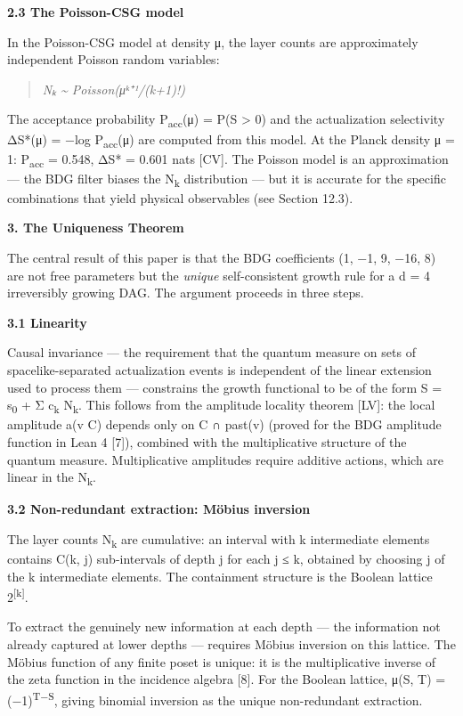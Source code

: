 \documentclass[12pt,a4paper]{article}
\begin{document}
\textbf{2.3 The Poisson-CSG model}

In the Poisson-CSG model at density μ, the layer counts are
approximately independent Poisson random variables:

\begin{quote}
\emph{Nₖ \textasciitilde{} Poisson(μᵏ⁺¹/(k+1)!)}
\end{quote}

The acceptance probability P\textsubscript{acc}(μ) = P(S \textgreater{}
0) and the actualization selectivity ΔS*(μ) = −log
P\textsubscript{acc}(μ) are computed from this model. At the Planck
density μ = 1: P\textsubscript{acc} = 0.548, ΔS* = 0.601 nats {[}CV{]}.
The Poisson model is an approximation --- the BDG filter biases the
N\textsubscript{k} distribution --- but it is accurate for the specific
combinations that yield physical observables (see Section 12.3).

\textbf{3. The Uniqueness Theorem}

The central result of this paper is that the BDG coefficients (1, −1, 9,
−16, 8) are not free parameters but the \emph{unique} self-consistent
growth rule for a d = 4 irreversibly growing DAG. The argument proceeds
in three steps.

\textbf{3.1 Linearity}

Causal invariance --- the requirement that the quantum measure on sets
of spacelike-separated actualization events is independent of the linear
extension used to process them --- constrains the growth functional to
be of the form S = s\textsubscript{0} + Σ c\textsubscript{k}
N\textsubscript{k}. This follows from the amplitude locality theorem
{[}LV{]}: the local amplitude a(v \textbar{} C) depends only on C ∩
past(v) (proved for the BDG amplitude function in Lean 4 {[}7{]}),
combined with the multiplicative structure of the quantum measure.
Multiplicative amplitudes require additive actions, which are linear in
the N\textsubscript{k}.

\textbf{3.2 Non-redundant extraction: Möbius inversion}

The layer counts N\textsubscript{k} are cumulative: an interval with k
intermediate elements contains C(k, j) sub-intervals of depth j for each
j ≤ k, obtained by choosing j of the k intermediate elements. The
containment structure is the Boolean lattice 2\textsuperscript{{[}k{]}}.

To extract the genuinely new information at each depth --- the
information not already captured at lower depths --- requires Möbius
inversion on this lattice. The Möbius function of any finite poset is
unique: it is the multiplicative inverse of the zeta function in the
incidence algebra {[}8{]}. For the Boolean lattice, μ(S, T) =
(−1)\textsuperscript{\textbar T\textbar−\textbar S\textbar{}}, giving
binomial inversion as the unique non-redundant extraction.
\end{document}
